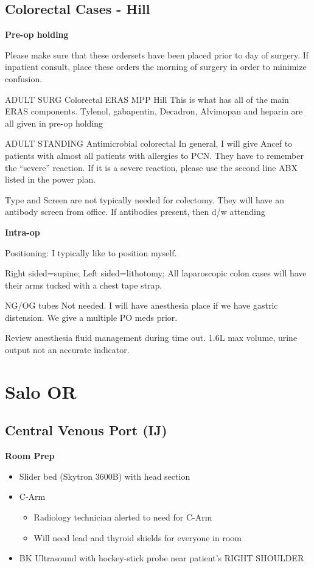 \documentclass[
]{book}
\providecommand{\tightlist}{%
  \setlength{\itemsep}{0pt}\setlength{\parskip}{0pt}}
\begin{document}
\hypertarget{colorectal-cases---hill}{%
\chapter{Colorectal Cases - Hill}\label{colorectal-cases---hill}}

\textbf{Pre-op holding}

Please make sure that these ordersets have been placed prior to day of surgery. If inpatient consult, place these orders the morning of surgery in order to minimize confusion.

ADULT SURG Colorectal ERAS MPP Hill This is what has all of the main ERAS components. Tylenol, gabapentin, Decadron, Alvimopan and heparin are all given in pre-op holding

ADULT STANDING Antimicrobial colorectal In general, I will give Ancef to patients with almost all patients with allergies to PCN. They have to remember the ``severe'' reaction. If it is a severe reaction, please use the second line ABX listed in the power plan.

Type and Screen are not typically needed for colectomy. They will have an antibody screen from office. If antibodies present, then d/w attending

\textbf{Intra-op}

Positioning: I typically like to position myself.

Right sided=supine; Left sided=lithotomy; All laparoscopic colon cases will have their arms tucked with a chest tape strap.

NG/OG tubes Not needed. I will have anesthesia place if we have gastric distension. We give a multiple PO meds prior.

Review anesthesia fluid management during time out. 1.6L max volume, urine output not an accurate indicator.

\hypertarget{part-salo-or}{%
\part*{Salo OR}\label{part-salo-or}}

\hypertarget{cv_port_salo}{%
\chapter{Central Venous Port (IJ)}\label{cv_port_salo}}

\textbf{Room Prep}

\begin{itemize}
\tightlist
\item
  Slider bed (Skytron 3600B) with head section
\item
  C-Arm

  \begin{itemize}
  \tightlist
  \item
    Radiology technician alerted to need for C-Arm
  \item
    Will need lead and thyroid shields for everyone in room
  \end{itemize}
\item
  BK Ultrasound with hockey-stick probe near patient's RIGHT SHOULDER
\end{itemize}
\end{document}
